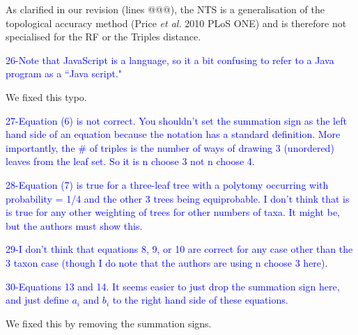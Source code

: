 \documentclass[11pt]{letter}
\begin{document}
\begin{letter}{}
As clarified in our revision (lines @@@), the NTS is a generalisation of the topological accuracy method (Price \textit{et al.} 2010 PLoS ONE) and is therefore not specialised for the RF or the Triples distance.


\textcolor{blue}{26-Note that JavaScript is a language, so it a bit confusing to refer to a Java program as a ``Java script."}

We fixed this typo.


\textcolor{blue}{27-Equation (6) is not correct. You shouldn't set the summation sign as the left hand side of an equation because the notation has a standard definition. More importantly, the $\#$ of triples is the number of ways of drawing 3 (unordered) leaves from the leaf set. So it is n choose 3 not n choose 4.}



\textcolor{blue}{28-Equation (7) is true for a three-leaf tree with a polytomy occurring with probability = 1/4 and the other 3 trees being equiprobable. I don't think that is is true for any other weighting of trees for other numbers of taxa. It might be, but the authors must show this.}



\textcolor{blue}{29-I don't think that equations 8, 9, or 10 are correct for any case other than the 3 taxon case (though I do note that the authors are using n choose 3 here).}



\textcolor{blue}{30-Equations 13 and 14. It seems easier to just drop the summation sign here, and just define $a_i$ and $b_i$ to the right hand side of these equations.}

We fixed this by removing the summation signs.


\end{letter}
\end{document}
